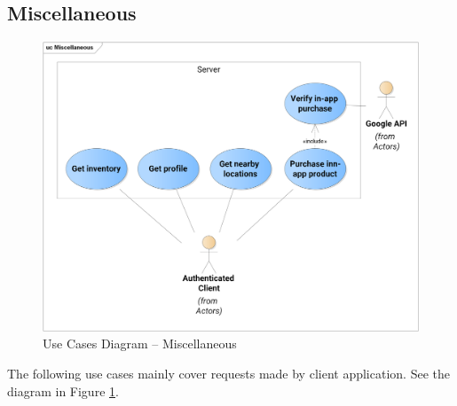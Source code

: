 	\subsection{Miscellaneous}
	\begin{figure}[h]	
		\includegraphics[width=\textwidth]{figures/UC_Miscellaneous}
		\centering			
		\caption{Use Cases Diagram -- Miscellaneous}
		\label{fig:ucmisc}
	\end{figure}
	The following use cases mainly cover requests made by client application. See the diagram in Figure \ref{fig:ucmisc}.
